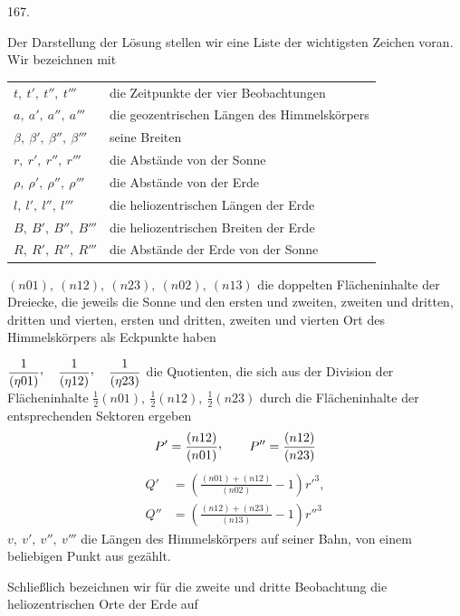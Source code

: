 \par{}\medskip
\begin{center}\hypertarget{native-230-article167}{}167.\end{center}
Der Darstellung der Lösung stellen wir eine Liste der wichtigsten Zeichen voran. Wir bezeichnen mit
\par\noindent
\begin{tabular}{@{}ll@{}}
$t,\ t',\ t'',\ t'''$ & die Zeitpunkte der vier Beobachtungen\\
$a,\ a',\ a'',\ a'''$ & die geozentrischen Längen des Himmelskörpers\\
$\beta,\ \beta',\ \beta'',\ \beta'''$ & seine Breiten\\
$r,\ r',\ r'',\ r'''$ & die Abstände von der Sonne\\
$\rho,\ \rho',\ \rho'',\ \rho'''$ & die Abstände von der Erde\\
$l,\ l',\ l'',\ l'''$ & die heliozentrischen Längen der Erde\\
$B,\ B',\ B'',\ B'''$ & die heliozentrischen Breiten der Erde\\
$R,\ R',\ R'',\ R'''$ & die Abstände der Erde von der Sonne
\end{tabular}
\par\noindent{}
$(n01),\ (n12),\ (n23),\ (n02),\ (n13)$ die doppelten Flächeninhalte der Dreiecke, die jeweils
die Sonne und den ersten und zweiten,
zweiten und dritten, dritten und vierten, ersten und dritten, zweiten und vierten Ort des Himmelskörpers als Eckpunkte haben
\par\noindent
$\dfrac{1}{(\eta01)}\mathpunct{\raisebox{.45ex}{,}}\quad
\dfrac{1}{(\eta12)}\mathpunct{\raisebox{.45ex}{,}}\quad
\dfrac{1}{(\eta23)}$ die Quotienten, die sich aus der Division der Flächeninhalte
\newline
$\frac12(n01),\ \frac12(n12),\ \frac12(n23)$
durch die Flächeninhalte der entsprechenden Sektoren ergeben
\[
P'=\frac{(n12)}{(n01)}\mathpunct{\raisebox{.45ex}{,}}\qquad
P''=\frac{(n12)}{(n23)}
\]
\[
\begin{aligned}
Q'&=\left(\frac{(n01)+(n12)}{(n02)}-1\right)r'^3,\\[.5em]
Q''&=\left(\frac{(n12)+(n23)}{(n13)}-1\right)r''^3
\end{aligned}
\]
\noindent $v,\ v',\ v'',\ v'''$ die Längen des Himmelskörpers auf seiner Bahn, von einem beliebigen Punkt aus gezählt.
\par
Schließlich bezeichnen wir für die zweite und dritte Beobachtung die heliozentrischen Orte der Erde auf
